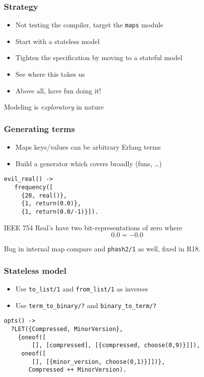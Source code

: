 \documentclass[lualatex]{beamer}
\begin{document}
\begin{frame}
\frametitle{Strategy}
\begin{itemize}
\item Not testing the compiler, target the \texttt{maps} module
\item Start with a stateless model
\item Tighten the specification by moving to a stateful model
\item See where this takes us
\item Above all, have fun doing it!
\end{itemize}

Modeling is \emph{exploratory} in nature
\end{frame}

\begin{frame}[fragile]
\frametitle{Generating terms}
\begin{itemize}
\item Maps keys/values can be arbitrary Erlang terms
\item Build a generator which covers broadly (funs, …)
\end{itemize}

\begin{verbatim}
evil_real() ->
   frequency([
     {20, real()},
     {1, return(0.0)},
     {1, return(0.0/-1)}]).
\end{verbatim}

IEEE 754 Real's have two bit-representations of zero where
$$
	0.0 = -0.0
$$

Bug in internal map compare and \texttt{phash2/1} as well, fixed in R18.
\end{frame}

\begin{frame}[fragile]
\frametitle{Stateless model}
\begin{itemize}
\item Use \texttt{to\_list/1} and \texttt{from\_list/1} as inverses
\item Use \texttt{term\_to\_binary/?} and \texttt{binary\_to\_term/?}
\end{itemize}

\begin{verbatim}
opts() ->
  ?LET({Compressed, MinorVersion},
    {oneof([
        [], [compressed], [{compressed, choose(0,9)}]]),
     oneof([
        [], [{minor_version, choose(0,1)}]])},
       Compressed ++ MinorVersion).
\end{verbatim}

\end{frame}
\end{document}
